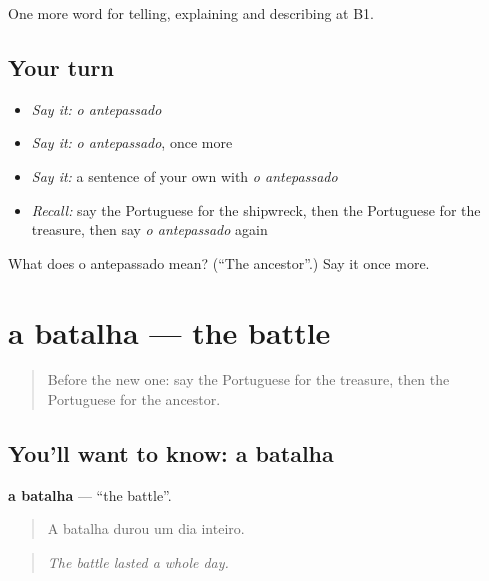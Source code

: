\begin{grammarlens}[title={What you've built}]
One more word for telling, explaining and describing at B1.
\end{grammarlens}

\subsection*{Your turn}
\begin{itemize}
\raggedright
  \item \emph{Say it:} \emph{o antepassado}
  \item \emph{Say it:} \emph{o antepassado}, once more
  \item \emph{Say it:} a sentence of your own with \emph{o antepassado}
  \item \emph{Recall:} say the Portuguese for the shipwreck, then the Portuguese for the treasure, then say \emph{o antepassado} again
\end{itemize}

\begin{tcolorbox}[breakable,colback=teal!4,colframe=teal!35!black,title={Before you move on}]
What does o antepassado mean? (\textquotedblleft{}The ancestor\textquotedblright{}.) Say it once more.
\end{tcolorbox}
\section[a batalha]{a batalha — the battle}

\label{lesson:PT-C329-batalha}



\begin{quote}
Before the new one: say the Portuguese for the treasure, then the Portuguese for the ancestor.
\end{quote}

\subsection*{You'll want to know: a batalha}
\textbf{a batalha} — \textquotedblleft{}the battle\textquotedblright{}.

\begin{quote}
A batalha durou um dia inteiro.
\end{quote}

\begin{quote}
\emph{The battle lasted a whole day.}
\end{quote}

